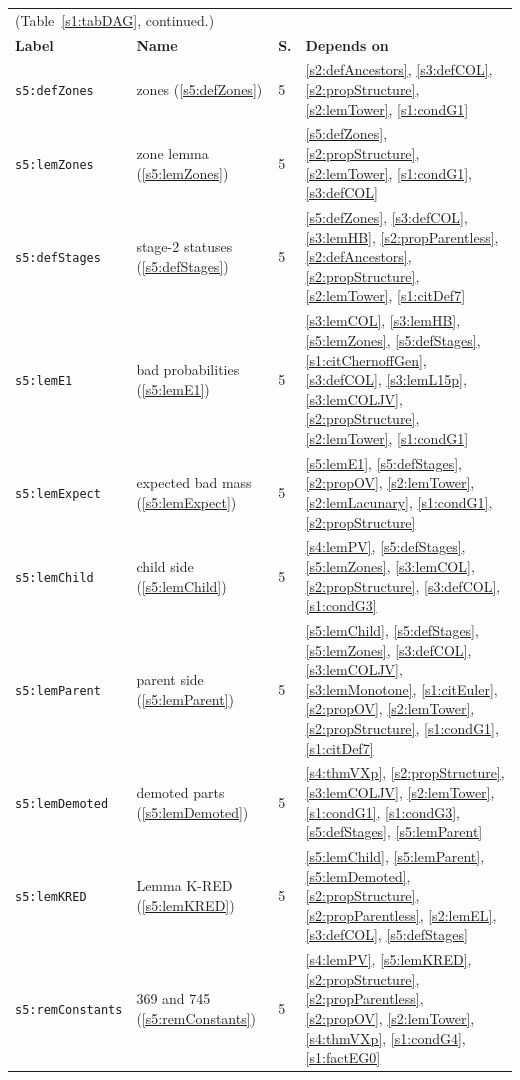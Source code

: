 \begin{center}
{\footnotesize
\setlength{\tabcolsep}{3pt}
\begin{tabular}{p{3.2cm}p{3.6cm}p{0.5cm}p{7.6cm}}
\multicolumn{4}{l}{(Table~\ref{s1:tabDAG}, continued.)}\\
\textbf{Label} & \textbf{Name} & \textbf{S.} & \textbf{Depends on}\\
\hline
\texttt{s5:defZones} & zones (\ref{s5:defZones}) & 5 & \ref{s2:defAncestors}, \ref{s3:defCOL}, \ref{s2:propStructure}, \ref{s2:lemTower}, \ref{s1:condG1}\\
\texttt{s5:lemZones} & zone lemma (\ref{s5:lemZones}) & 5 & \ref{s5:defZones}, \ref{s2:propStructure}, \ref{s2:lemTower}, \ref{s1:condG1}, \ref{s3:defCOL}\\
\texttt{s5:defStages} & stage-2 statuses (\ref{s5:defStages}) & 5 & \ref{s5:defZones}, \ref{s3:defCOL}, \ref{s3:lemHB}, \ref{s2:propParentless}, \ref{s2:defAncestors}, \ref{s2:propStructure}, \ref{s2:lemTower}, \ref{s1:citDef7}\\
\texttt{s5:lemE1} & bad probabilities (\ref{s5:lemE1}) & 5 & \ref{s3:lemCOL}, \ref{s3:lemHB}, \ref{s5:lemZones}, \ref{s5:defStages}, \ref{s1:citChernoffGen}, \ref{s3:defCOL}, \ref{s3:lemL15p}, \ref{s3:lemCOLJV}, \ref{s2:propStructure}, \ref{s2:lemTower}, \ref{s1:condG1}\\
\texttt{s5:lemExpect} & expected bad mass (\ref{s5:lemExpect}) & 5 & \ref{s5:lemE1}, \ref{s5:defStages}, \ref{s2:propOV}, \ref{s2:lemTower}, \ref{s2:lemLacunary}, \ref{s1:condG1}, \ref{s2:propStructure}\\
\texttt{s5:lemChild} & child side (\ref{s5:lemChild}) & 5 & \ref{s4:lemPV}, \ref{s5:defStages}, \ref{s5:lemZones}, \ref{s3:lemCOL}, \ref{s2:propStructure}, \ref{s3:defCOL}, \ref{s1:condG3}\\
\texttt{s5:lemParent} & parent side (\ref{s5:lemParent}) & 5 & \ref{s5:lemChild}, \ref{s5:defStages}, \ref{s5:lemZones}, \ref{s3:defCOL}, \ref{s3:lemCOLJV}, \ref{s3:lemMonotone}, \ref{s1:citEuler}, \ref{s2:propOV}, \ref{s2:lemTower}, \ref{s2:propStructure}, \ref{s1:condG1}, \ref{s1:citDef7}\\
\texttt{s5:lemDemoted} & demoted parts (\ref{s5:lemDemoted}) & 5 & \ref{s4:thmVXp}, \ref{s2:propStructure}, \ref{s3:lemCOLJV}, \ref{s2:lemTower}, \ref{s1:condG1}, \ref{s1:condG3}, \ref{s5:defStages}, \ref{s5:lemParent}\\
\texttt{s5:lemKRED} & Lemma K-RED (\ref{s5:lemKRED}) & 5 & \ref{s5:lemChild}, \ref{s5:lemParent}, \ref{s5:lemDemoted}, \ref{s2:propStructure}, \ref{s2:propParentless}, \ref{s2:lemEL}, \ref{s3:defCOL}, \ref{s5:defStages}\\
\texttt{s5:remConstants} & 369 and 745 (\ref{s5:remConstants}) & 5 & \ref{s4:lemPV}, \ref{s5:lemKRED}, \ref{s2:propStructure}, \ref{s2:propParentless}, \ref{s2:propOV}, \ref{s2:lemTower}, \ref{s4:thmVXp}, \ref{s1:condG4}, \ref{s1:factEG0}\\
\hline
\end{tabular}}
\end{center}

